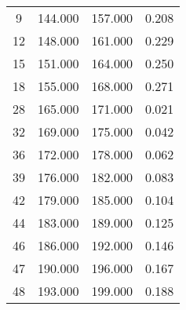 % 
\begin{tabular}{cccc}
  \hline
  \hline
9 & 144.000 & 157.000 & 0.208 \\ 
  12 & 148.000 & 161.000 & 0.229 \\ 
  15 & 151.000 & 164.000 & 0.250 \\ 
  18 & 155.000 & 168.000 & 0.271 \\ 
  28 & 165.000 & 171.000 & 0.021 \\ 
  32 & 169.000 & 175.000 & 0.042 \\ 
  36 & 172.000 & 178.000 & 0.062 \\ 
  39 & 176.000 & 182.000 & 0.083 \\ 
  42 & 179.000 & 185.000 & 0.104 \\ 
  44 & 183.000 & 189.000 & 0.125 \\ 
  46 & 186.000 & 192.000 & 0.146 \\ 
  47 & 190.000 & 196.000 & 0.167 \\ 
  48 & 193.000 & 199.000 & 0.188 \\ 
   \hline
\end{tabular}
